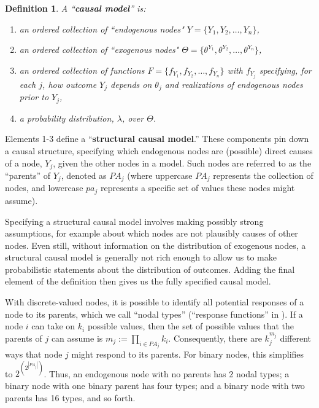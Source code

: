 \documentclass[
  11pt,
  article]{jss}
\newtheorem{definition}{Definition}
\begin{document}
\begin{definition}
  
  A ``\textbf{causal model}'' is:
  \begin{enumerate}
    \item an ordered collection of ``endogenous nodes" $Y = \{Y_1, Y_2, \dots, Y_n\}$,
    \item an ordered collection of ``exogenous nodes" $\Theta = \{\theta^{Y_1}, \theta^{Y_2}, \dots, \theta^{Y_n}\}$,
    \item an ordered collection of functions $F = \{f_{Y_1}, f_{Y_2}, \dots, f_{Y_n}\}$ with $f_{Y_j}$ specifying, for each $j$, how outcome $Y_j$ depends on $\theta_j$ and realizations of endogenous nodes prior to $Y_j$,
    \item a probability distribution, $\lambda$, over $\Theta$.
  \end{enumerate}
  
\end{definition}

Elements 1-3 define a ``\textbf{structural causal model}.'' These
components pin down a causal structure, specifying which endogenous
nodes are (possible) direct causes of a node, \(Y_j\), given the other
nodes in a model. Such nodes are referred to as the ``parents'' of
\(Y_j\), denoted as \(PA_j\) (where uppercase \(PA_j\) represents the
collection of nodes, and lowercase \(pa_j\) represents a specific set of
values these nodes might assume).

Specifying a structural causal model involves making possibly strong
assumptions, for example about which nodes are not plausibly causes of
other nodes. Even still, without information on the distribution of
exogenous nodes, a structural causal model is generally not rich enough
to allow us to make probabilistic statements about the distribution of
outcomes. Adding the final element of the definition then gives us the
fully specified causal model.

With discrete-valued nodes, it is possible to identify all potential
responses of a node to its parents, which we call ``nodal types''
(``response functions'' in \citet{pearl_causality_2009}). If a node
\(i\) can take on \(k_i\) possible values, then the set of possible
values that the parents of \(j\) can assume is
\(m_j :=\prod_{i\in PA_j}k_i\). Consequently, there are \(k_j^{m_j}\)
different ways that node \(j\) might respond to its parents. For binary
nodes, this simplifies to \(2^{\left(2^{|PA_j|}\right)}\). Thus, an
endogenous node with no parents has 2 nodal types; a binary node with
one binary parent has four types; and a binary node with two parents has
16 types, and so forth.
\end{document}
